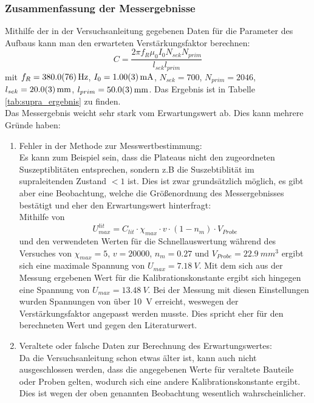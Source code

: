 \documentclass[12pt,a4paper]{article}
\begin{document}
\newpage
\subsubsection{Zusammenfassung der Messergebnisse}
Mithilfe der in der Versuchsanleitung gegebenen Daten für die Parameter des Aufbaus kann man den erwarteten Verstärkungsfaktor berechnen:
\begin{equation*}
C = \dfrac{2\pi f_R \mu_0 I_0 N_{sek} N_{prim}}{l_{sek} l_{prim}}
\end{equation*}
mit $f_R = \SI{380\pm 7.6}{Hz}$, $I_0 = \SI{1 \pm 0.03}{mA}$, $N_{sek} = 700$, $N_{prim} = 2046$, $l_{sek} = \SI{20\pm 0.3}{mm}$, $l_{prim} = \SI{50 \pm 0.3}{mm}$. Das Ergebnis ist in Tabelle \ref{tab:supra_ergebnis} zu finden.\\
Das Messergebnis weicht sehr stark vom Erwartungswert ab. Dies kann mehrere Gründe haben:
\begin{enumerate}
\item Fehler in der Methode zur Messwertbestimmung:\\
Es kann zum Beispiel sein, dass die Plateaus nicht den zugeordneten Suszeptiblitäten entsprechen, sondern z.B die Suszebtiblität im supraleitenden Zustand $<1$ ist.
Dies ist zwar grundsätzlich möglich, es gibt aber eine Beobachtung, welche die Größenordnung des Messergebnisses bestätigt und eher den Erwartungswert hinterfragt:\\
Mithilfe von 
\begin{equation*}
U_{max}^{lit} = C_{lit} \cdot \chi_{max} \cdot v \cdot (1-n_m) \cdot V_{Probe}
\end{equation*}
und den verwendeten Werten für die Schnellauswertung während des Versuches von $\chi_{max} = 5$, $v = 20000$, $n_m = 0.27$ und $V_{Probe} = \SI{22,9}{mm^3}$ ergibt sich eine maximale Spannung von $U_{max} = \SI{7,18}{V}$. Mit dem sich aus der Messung ergebenen Wert für die Kalibrationskonstante ergibt sich hingegen eine Spannung von $U_{max} = \SI{13,48}{V}$. Bei der Messung mit diesen Einstellungen wurden Spannungen von über \SI{10}{V} erreicht, weswegen der Verstärkungsfaktor angepasst werden musste. Dies spricht eher für den berechneten Wert und gegen den Literaturwert.
\item Veraltete oder falsche Daten zur Berechnung des Erwartungswertes:\\
Da die Versuchsanleitung schon etwas älter ist, kann auch nicht ausgeschlossen werden, dass die angegebenen Werte für veraltete Bauteile oder Proben gelten, wodurch sich eine andere Kalibrationskonstante ergibt. Dies ist wegen der oben genannten Beobachtung wesentlich wahrscheinlicher.
\end{enumerate}
\end{document}
